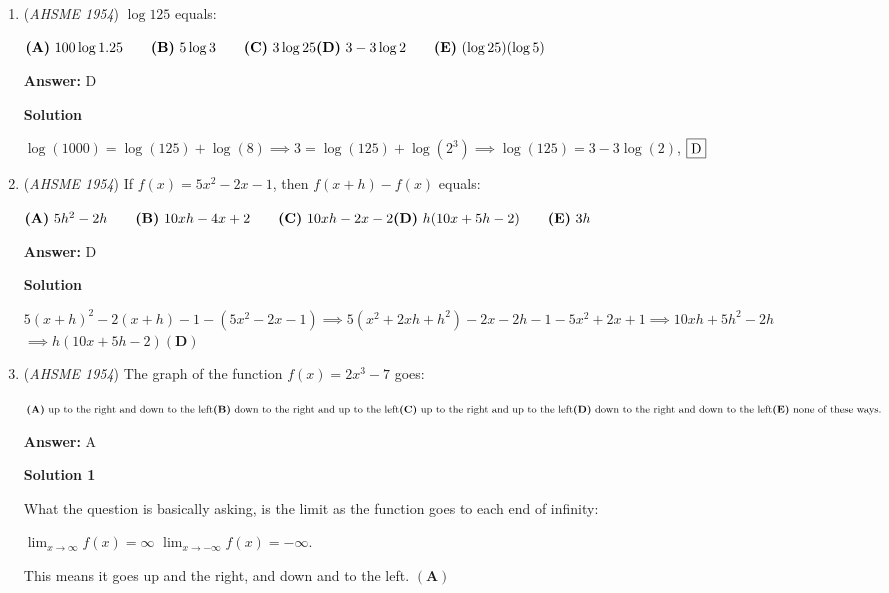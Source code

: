 \begin{enumerate}
	\item (\textit{AHSME 1954}) $\log 125$ equals: 


 $\textbf{(A)}\ 100 \log 1.25 \qquad \textbf{(B)}\ 5 \log 3 \qquad \textbf{(C)}\ 3 \log 25  \\ \textbf{(D)}\ 3 - 3\log 2 \qquad \textbf{(E)}\ (\log 25)(\log 5)$

 \textbf{Answer: }D



\textbf{Solution}

$\log(1000)=\log(125)+\log(8)\implies 3=\log(125)+\log(2^3)\implies \log(125)=3-3\log(2)$, $\fbox{D}$



	\item (\textit{AHSME 1954}) If $f(x) = 5x^2 - 2x - 1$, then $f(x + h) - f(x)$ equals: 


 $\textbf{(A)}\ 5h^2 - 2h \qquad \textbf{(B)}\ 10xh - 4x + 2 \qquad \textbf{(C)}\ 10xh - 2x - 2 \\ \textbf{(D)}\ h(10x+5h-2)\qquad\textbf{(E)}\ 3h$

 \textbf{Answer: }D



\textbf{Solution}

$5(x+h)^2 - 2(x+h) - 1-(5x^2 - 2x - 1)\implies 5(x^2+2xh+h^2)-2x-2h-1-5x^2+2x+1\implies 10xh+5h^2-2h$
$\implies h(10x+5h-2) \boxed{(\textbf{D})}$



	\item (\textit{AHSME 1954}) The graph of the function $f(x) = 2x^3 - 7$ goes: 


 $\textbf{(A)}\ \text{up to the right and down to the left} \\ \textbf{(B)}\ \text{down to the right and up to the left}\\ \textbf{(C)}\ \text{up to the right and up to the left}\\ \textbf{(D)}\ \text{down to the right and down to the left}\\ \textbf{(E)}\ \text{none of these ways.}$

 \textbf{Answer: }A



\textbf{Solution 1}

What the question is basically asking, is the limit as the function goes to each end of infinity: 

 $\lim_{x\to\infty} f(x)=\infty$
$\lim_{x\to-\infty} f(x)=-\infty$. 

 This means it goes up and the right, and down and to the left. $\boxed{(\textbf{A})}$




\end{enumerate}
